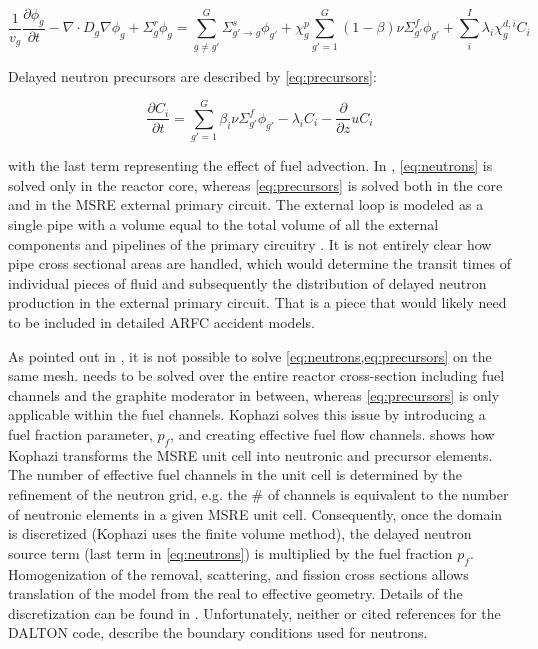 \documentclass{article}
\begin{document}
\begin{equation}
\frac{1}{v_g}\frac{\partial \phi_g}{\partial t} - \nabla \cdot D_g \nabla \phi_g
+ \Sigma_g^r \phi_g = \sum_{g \ne g'}^G \Sigma_{g'\rightarrow g}^s \phi_{g'} + \chi_g^p \sum_{g' = 1}^G (1 - \beta)
\nu \Sigma_{g'}^f \phi_{g'} + \sum_i^I \lambda_i \chi_g^{d,i} C_i
\label{eq:neutrons}
\end{equation}

Delayed neutron precursors are described by \cref{eq:precursors}:

\begin{equation}
\frac{\partial C_i}{\partial t} = \sum_{g'= 1}^G \beta_i \nu \Sigma_{g'}^f
\phi_{g'} - \lambda_i C_i - \frac{\partial}{\partial z} u C_i
\label{eq:precursors}
\end{equation}

with the last term representing the effect of fuel advection. In
\cite{kophazi_development_2009}, \cref{eq:neutrons} is solved only in the
reactor core, whereas \cref{eq:precursors} is solved both in the core and in the
\gls{MSRE} external primary circuit. The external loop is modeled as a single pipe
with a volume equal to the total volume of all the external components and
pipelines of the primary circuitry \cite{kophazi_development_2009}. It is not
entirely clear how pipe cross sectional areas are handled, which would determine
the transit times of individual pieces of fluid and subsequently the
distribution of delayed neutron production in the external primary circuit. That
is a piece that would likely need to be included in detailed \gls{ARFC} accident
models.

As pointed out in \cite{kophazi_development_2009}, it is not possible to solve
\cref{eq:neutrons,eq:precursors} on the same mesh.  needs to
be solved over the entire reactor cross-section including fuel channels and the
graphite moderator in between, whereas \cref{eq:precursors} is only applicable
within the fuel channels. Kophazi solves this issue by introducing a fuel
fraction parameter, $p_f$, and creating effective fuel flow
channels.  shows how Kophazi transforms the \gls{MSRE} unit
cell into neutronic and precursor elements. The number of effective fuel
channels in the unit cell is determined by the refinement of the neutron grid,
e.g. the \# of channels is equivalent to the number of neutronic elements in a
given \gls{MSRE} unit cell. Consequently, once the domain is discretized (Kophazi uses
the finite volume method), the delayed neutron source term (last term in
\cref{eq:neutrons}) is multiplied by the fuel fraction $p_f$. Homogenization of
the removal, scattering, and fission cross sections allows translation of the
model from the real to effective geometry. Details of the discretization can be
found in \cite{kophazi_development_2009}. Unfortunately, neither
\cite{kophazi_development_2009} or cited references for the DALTON code,
describe the boundary conditions used for neutrons.
\end{document}

